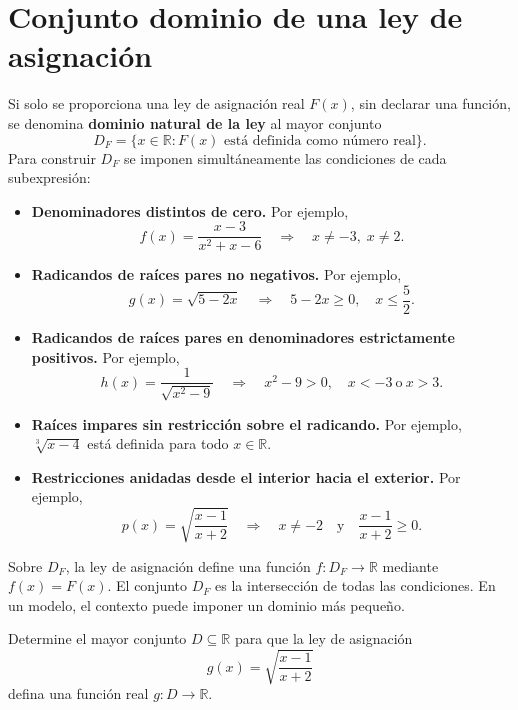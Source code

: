 \documentclass[10pt,a5paper]{article}
\newif\ifmostrarSoluciones
\begin{document}
\section*{Conjunto dominio de una ley de asignación}

\begin{proposicion}
Si solo se proporciona una ley de asignación real $F(x)$, sin declarar una función, se denomina \textbf{dominio natural de la ley} al mayor conjunto
\[
D_F=\{x\in\mathbb{R}:F(x)\text{ está definida como número real}\}.
\]
Para construir $D_F$ se imponen simultáneamente las condiciones de cada subexpresión:
\begin{itemize}
  \item \textbf{Denominadores distintos de cero.} Por ejemplo,
  \[
  f(x)=\frac{x-3}{x^2+x-6}
  \quad\Longrightarrow\quad x\neq-3,\;x\neq2.
  \]
  \item \textbf{Radicandos de raíces pares no negativos.} Por ejemplo,
  \[
  g(x)=\sqrt{5-2x}
  \quad\Longrightarrow\quad 5-2x\geq0,
  \quad x\leq\frac52.
  \]
  \item \textbf{Radicandos de raíces pares en denominadores estrictamente positivos.} Por ejemplo,
  \[
  h(x)=\frac{1}{\sqrt{x^2-9}}
  \quad\Longrightarrow\quad x^2-9>0,
  \quad x<-3\ \text{o}\ x>3.
  \]
  \item \textbf{Raíces impares sin restricción sobre el radicando.} Por ejemplo, $\sqrt[3]{x-4}$ está definida para todo $x\in\mathbb{R}$.
  \item \textbf{Restricciones anidadas desde el interior hacia el exterior.} Por ejemplo,
  \[
  p(x)=\sqrt{\frac{x-1}{x+2}}
  \quad\Longrightarrow\quad x\neq-2
  \quad\text{y}\quad\frac{x-1}{x+2}\geq0.
  \]
\end{itemize}
Sobre $D_F$, la ley de asignación define una función $f:D_F\to\mathbb{R}$ mediante $f(x)=F(x)$. El conjunto $D_F$ es la intersección de todas las condiciones. En un modelo, el contexto puede imponer un dominio más pequeño.
\end{proposicion}

\begin{ejemplo}
Determine el mayor conjunto $D\subseteq\mathbb{R}$ para que la ley de asignación
\[
g(x)=\sqrt{\frac{x-1}{x+2}}
\]
defina una función real $g:D\to\mathbb{R}$.
\end{ejemplo}
\ifmostrarSoluciones
\begin{solucion}
Se exige $(x-1)/(x+2)\geq0$ y $x\neq-2$. El análisis de signos en $-2$ y $1$ da
\[
\operatorname{Dom}(g)=(-\infty,-2)\cup[1,\infty).
\]
\end{solucion}
\else\vspace{15mm}\fi
\end{document}
